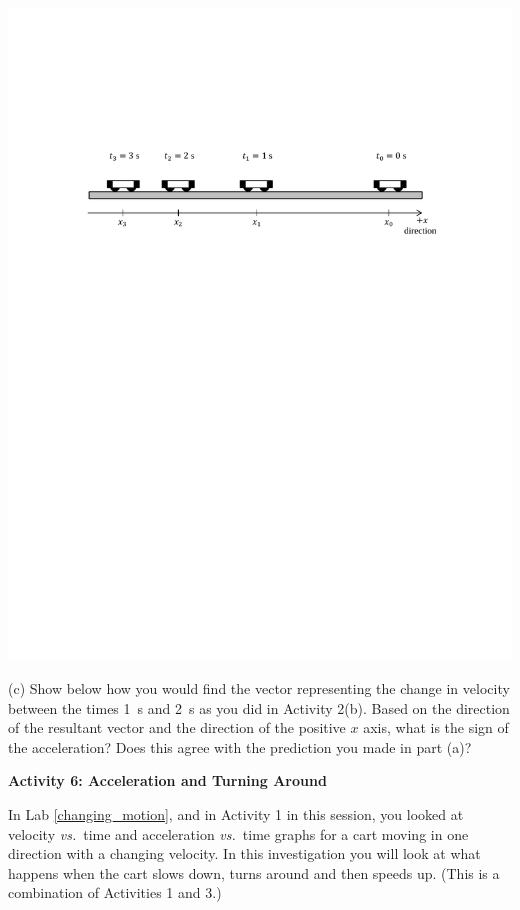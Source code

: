 {\par\centering \includegraphics{slowing/carts_slowing2.pdf} \par}

(c) Show below how you would find the vector representing the change in velocity
between the times 1~s and 2~s as you did in Activity 2(b). Based on the 
direction of the resultant vector and the direction of the positive $x$ axis, 
what is the sign of the acceleration? 
Does this agree with the prediction you made in part (a)?
\answerspace{10mm}

\pagebreak[2]
\textbf{Activity 6: Acceleration and Turning Around }

In Lab \ref{changing_motion}, and in Activity 1 in this session, you looked at
velocity \textit{vs.}~time and acceleration \textit{vs.}~time graphs for a cart moving in one
direction with a changing velocity. In this investigation you will look at what
happens when the cart slows down, turns around and then speeds up. (This is a
combination of Activities 1 and 3.)


